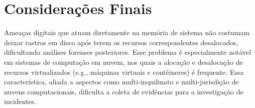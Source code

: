 \documentclass[conference]{IEEEtran}
\newcommand{\marcosT}[1]{{\color{red}{TODO: #1}}}
\begin{document}
%



\section{Considerações Finais}
\label{sec:conclusion}

%
Ameaças digitais que atuam diretamente na memória de sistema não costumam deixar rastros em disco após terem os recursos correspondentes desalocados, dificultando análises forenses posteriores.
%
Esse problema é especialmente notável em sistemas de computação em nuvem, nos quais a alocação e desalocação de recursos virtualizados (e.g., máquinas virtuais e contêineres) é frequente.
%
Essa característica, aliada a aspectos como multi-inquilinato e multi-jurisdição de nuvens computacionais, dificulta a coleta de evidências para a investigação de incidentes.
\end{document}
